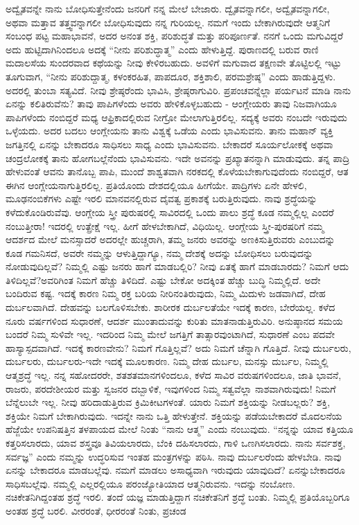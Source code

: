 ಅದ್ವೈತವನ್ನೇ ನಾನು ಬೋಧಿಸುತ್ತೇನೆಂದು ಜನರಿಗೆ ನನ್ನ ಮೇಲೆ ಬೇಜಾರು. ದ್ವೈತವನ್ನಾಗಲೀ, ಅದ್ವೈತವನ್ನಾಗಲೀ, ಅಥವಾ ಮತ್ತಾವ ತತ್ತ್ವವನ್ನಾಗಲೀ ಬೋಧಿಸುವುದು ನನ್ನ ಗುರಿಯಲ್ಲ. ನಮಗೆ ಇಂದು ಬೇಕಾಗಿರುವುದೇ ಆತ್ಮನಿಗೆ ಸಂಬಂಧ ಪಟ್ಟ ಮಹಾಭಾವನೆ, ಅದರ ಅನಂತ ಶಕ್ತಿ, ಪರಿಶುದ್ಧತೆ ಮತ್ತು ಪರಿಪೂರ್ಣತೆ. ನನಗೆ ಒಂದು ಮಗುವಿದ್ದರೆ ಅದು ಹುಟ್ಟಿದಾಗಿನಿಂದಲೂ ಅದಕ್ಕೆ “ನೀನು ಪರಿಶುದ್ಧಾತ್ಮ” ಎಂದು ಹೇಳುತ್ತಿದ್ದೆ. ಪುರಾಣದಲ್ಲಿ ಬರುವ ರಾಣಿ ಮದಾಲಸೆಯ ಸುಂದರವಾದ ಕಥೆಯನ್ನು ನೀವು ಕೇಳಿರಬಹುದು. ಅವಳಿಗೆ ಮಗುವಾದ ತಕ್ಷಣವೇ ತೊಟ್ಟಿಲಲ್ಲಿ ಇಟ್ಟು ತೂಗುವಾಗ, “ನೀನು ಪರಿಶುದ್ದಾತ್ಮ, ಕಳಂಕರಹಿತ, ಪಾಪದೂರ, ಶಕ್ತಿಶಾಲಿ, ಪರಮಶ್ರೇಷ್ಠ” ಎಂದು ಹಾಡುತ್ತಿದ್ದಳು. ಅದರಲ್ಲಿ ತುಂಬಾ ಸತ್ಯವಿದೆ. ನೀವು ಶ್ರೇಷ್ಠರೆಂದು ಭಾವಿಸಿ, ಶ್ರೇಷ್ಠರಾಗುವಿರಿ. ಪ್ರಪಂಚವನ್ನೆಲ್ಲಾ ಪರ್ಯಟನೆ ಮಾಡಿ ನಾನು ಏನನ್ನು ಕಲಿತಿರುವೆನು? ತಾವು ಪಾಪಿಗಳೆಂದು ಅವರು ಹೇಳಿಕೊಳ್ಳಬಹುದು - ಆಂಗ್ಲೇಯರು ತಾವು ನಿಜವಾಗಿಯೂ ಪಾಪಿಗಳೆಂದು ನಂಬಿದ್ದರೆ ಮಧ್ಯ ಆಫ್ರಿಕಾದಲ್ಲಿರುವ ನೀಗ್ರೋ ಮೇಲಾಗುತ್ತಿರಲಿಲ್ಲ. ಸದ್ಯಕ್ಕೆ ಅವರು ನಂಬದೇ ಇರುವುದು ಒಳ್ಳೆಯದು. ಅದರ ಬದಲು ಆಂಗ್ಲೇಯನು ತಾನು ವಿಶ್ವಕ್ಕೆ ಒಡೆಯ ಎಂದು ಭಾವಿಸುವನು. ತಾನು ಮಹಾನ್​ ವ್ಯಕ್ತಿ ಜಗತ್ತಿನಲ್ಲಿ ಏನನ್ನು ಬೇಕಾದರೂ ಸಾಧಿಸಲು ಸಾಧ್ಯ ಎಂದು ಭಾವಿಸುವನು. ಬೇಕಾದರೆ ಸೂರ್ಯಲೋಕಕ್ಕೆ ಅಥವಾ ಚಂದ್ರಲೋಕಕ್ಕೆ ತಾನು ಹೋಗಬಲ್ಲೆನೆಂದು ಭಾವಿಸುವನು. ಇದೇ ಅವನನ್ನು ಪ್ರಖ್ಯಾತನನ್ನಾಗಿ ಮಾಡುವುದು. ತನ್ನ ಪಾದ್ರಿ ಹೇಳುವಂತೆ ಆವನು ತಾನೊಬ್ಬ ಪಾಪಿ, ಮುಂದೆ ಶಾಶ್ವತವಾಗಿ ನರಕದಲ್ಲಿ ಕೊಳೆಯಬೇಕಾಗುವುದೆಂದು ನಂಬಿದ್ದರೆ, ಆತ ಈಗಿನ ಆಂಗ್ಲೇಯ\-ನಾಗುತ್ತಿರಲಿಲ್ಲ. ಪ್ರತಿಯೊಂದು ದೇಶದಲ್ಲಿಯೂ ಹೀಗೆಯೇ. ಪಾದ್ರಿಗಳು ಏನೇ ಹೇಳಲಿ, ಮೂಢನಂಬಿಕೆಗಳು ಎಷ್ಟೇ ಇರಲಿ ಮಾನವನಲ್ಲಿರುವ ದೈವತ್ವ ಪ್ರಕಾಶಕ್ಕೆ ಬರುತ್ತಿರುವುದು. ನಾವು ಶ್ರದ್ಧೆಯನ್ನು ಕಳೆದುಕೊಂಡಿರುವೆವು. ಆಂಗ್ಲೇಯ ಸ್ತ್ರೀ ಪುರುಷರಲ್ಲಿ ಸಾವಿರದಲ್ಲಿ ಒಂದು ಪಾಲು ಶ್ರದ್ಧೆ ಕೂಡ ನಮ್ಮಲ್ಲಿಲ್ಲ ಎಂದರೆ ನಂಬುತ್ತೀರಾ! ಇದರಲ್ಲಿ ಉತ್ಪ್ರೇಕ್ಷೆ ಇಲ್ಲ. ಹೀಗೆ ಹೇಳಬೇಕಾಗಿದೆ, ವಿಧಿಯಿಲ್ಲ. ಆಂಗ್ಲೇಯ ಸ್ತ್ರೀ-ಪುರಷರಿಗೆ ನಮ್ಮ ಆದರ್ಶದ ಮೇಲೆ ಮನಸ್ಸಾದರೆ ಅದರಲ್ಲೇ ಹುಚ್ಚರಾಗಿ, ತಮ್ಮ ಜನರು ಅವರನ್ನು ಅಣಕಿಸುತ್ತಿರುವರು ಎಂಬುದನ್ನು ಕೂಡ ಗಮನಿಸದೆ, ಅವರೇ ನಮ್ಮನ್ನು ಆಳುತ್ತಿದ್ದಾಗ್ಯೂ, ನಮ್ಮ ದೇಶಕ್ಕೆ ಅದನ್ನು ಬೋಧಿಸಲು ಬರುವುದನ್ನು ನೋಡುವುದಿಲ್ಲವೆ? ನಿಮ್ಮಲ್ಲಿ ಎಷ್ಟು ಜನರು ಹಾಗೆ ಮಾಡಬಲ್ಲಿರಿ? ನೀವು ಏತಕ್ಕೆ ಹಾಗೆ ಮಾಡಬಾರದು? ನಿಮಗೆ ಆದು ತಿಳಿದಿಲ್ಲವೆ?\break ಅವರಿಗಿಂತ ನಿಮಗೆ ಹೆಚ್ಚು ತಿಳಿದಿದೆ. ಎಷ್ಟು ಬೇಕೋ ಅದಕ್ಕಿಂತ ಹೆಚ್ಚು ಬುದ್ಧಿ ನಿಮ್ಮಲ್ಲಿದೆ. ಅದೇ ಬಂದಿರುವ ಕಷ್ಟ. ಇದಕ್ಕೆ ಕಾರಣ ನಿಮ್ಮ ರಕ್ತ ಬರಿಯ ನೀರಿನಂತಿರುವುದು, ನಿಮ್ಮ ಮಿದುಳು ಜಡವಾಗಿದೆ, ದೇಹ ದುರ್ಬಲವಾಗಿದೆ. ದೇಹವನ್ನು ಬಲಗೊಳಿಸಬೇಕು. ಶಾರೀರಕ ದುರ್ಬಲತೆಯೇ ಇದಕ್ಕೆ ಕಾರಣ, ಬೇರೆಯಲ್ಲ. ಕಳೆದ ನೂರು ವರ್ಷಗಳಿಂದ ಸುಧಾರಣೆ, ಆದರ್ಶ ಮುಂತಾದುವನ್ನು ಕುರಿತು ಮಾತನಾಡುತ್ತಿರುವಿರಿ. ಅನುಷ್ಠಾನದ ಸಮಯ ಬಂದರೆ ನಿಮ್ಮ ಸುಳಿವೇ ಇಲ್ಲ. ಇದರಿಂದ ನಿಮ್ಮ ಮೇಲೆ ಜಗತ್ತಿಗೆ ತಾತ್ಸಾರವುಂಟಾಗಿದೆ, ಸುಧಾರಣೆ ಎಂಬ ಪದವೇ ಹಾಸ್ಯಾಸ್ಪದವಾಗಿದೆ. ಇದಕ್ಕೆ ಕಾರಣವೇನು? ನಿಮಗೆ ಗೊತ್ತಿಲ್ಲವೆ? ಅದು ನಿಮಗೆ ಚೆನ್ನಾಗಿ ಗೊತ್ತಿದೆ. ನೀವು ದುರ್ಬಲರು, ದುರ್ಬಲರು, ದುರ್ಬಲರು-ಇದೇ ಇದಕ್ಕೆ ಮೂಲಕಾರಣ. ನಿಮ್ಮ ದೇಹ ದುರ್ಬಲ, ಮನಸ್ಸು ದುರ್ಬಲ, ನಿಮ್ಮಲ್ಲಿ ಆತ್ಮಶ್ರದ್ಧೆ ಇಲ್ಲ. ನನ್ನ ಸಹೋದರರೇ, ಶತಶತಮಾನಗಳಿಂದಲೂ, ಕಳೆದ ಸಾವಿರ ವರುಷಗಳಿಂದಲೂ, ಜಾತಿ ಭಾವನೆ, ರಾಜರು, ಪರದೇಶೀಯರ ಮತ್ತು ಸ್ವಜನರ ದಬ್ಬಾಳಿಕೆ, ಇವುಗಳಿಂದ ನಿಮ್ಮ ಸತ್ವವೆಲ್ಲಾ ನಾಶವಾಗಿರುವುದು! ನಿಮಗೆ ಬೆನ್ನೆಲುಬೇ ಇಲ್ಲ. ನೀವು ಹರಿದಾಡುತ್ತಿರುವ ಕ್ರಿಮಿಕೀಟಗಳಂತೆ. ಯಾರು ನಿಮಗೆ ಶಕ್ತಿಯನ್ನು ನೀಡಬಲ್ಲರು? ಶಕ್ತಿ, ಶಕ್ತಿಯೇ ನಿಮಗೆ ಬೇಕಾಗಿರುವುದು. ಇದನ್ನೇ ನಾನು ಒತ್ತಿ ಹೇಳುತ್ತೇನೆ. ಶಕ್ತಿಯನ್ನು ಪಡೆಯಬೇಕಾದರೆ ಮೊದಲನೆಯ ಹೆಜ್ಜೆಯೇ ಉಪನಿಷತ್ತಿನ ತಳಪಾಯದ ಮೇಲೆ ನಿಂತು “ನಾನು ಆತ್ಮ” ಎಂದು ನಂಬುವುದು. “ನನ್ನನ್ನು ಯಾವ ಕತ್ತಿಯೂ ಕತ್ತರಿಸಲಾರದು, ಯಾವ ಶಸ್ತ್ರವೂ ತಿವಿಯಲಾರದು, ಬೆಂಕಿ ದಹಿಸ\-ಲಾರದು, ಗಾಳಿ ಒಣಗಿಸಲಾರದು. ನಾನು ಸರ್ವಶಕ್ತ, ಸರ್ವಜ್ಞ” ಎಂದು ನಮ್ಮನ್ನು ಉದ್ಧರಿಸುವ ಇಂತಹ ಮಂತ್ರಗಳನ್ನು ಪಠಿಸಿ. ನಾವು ದುರ್ಬಲರೆಂದು ಹೇಳಬೇಡಿ. ನಾವು ಏನನ್ನು ಬೇಕಾದರೂ ಮಾಡಬಲ್ಲೆವು. ನಮಗೆ ಮಾಡಲು ಅಸಾಧ್ಯವಾಗಿ ಇರುವುದು ಯಾವುದಿದೆ? ಏನನ್ನುಬೇಕಾದರೂ ಸಾಧಿಸಬಲ್ಲೆವು. ನಮ್ಮಲ್ಲಿ ಎಲ್ಲರಲ್ಲಿಯೂ ಪರಂಜ್ಯೋತಿಯಾದ ಆತ್ಮನಿರುವನು. ಇದನ್ನು ನಂಬೋಣ. ನಚಿಕೇತನಿಗಿದ್ದಂತಹ ಶ್ರದ್ಧೆ ಇರಲಿ. ತಂದೆ ಯಜ್ಞ ಮಾಡುತ್ತಿದ್ದಾಗ ನಚಿಕೇತನಿಗೆ ಶ್ರದ್ಧೆ ಬಂತು. ನಿಮ್ಮಲ್ಲಿ ಪ್ರತಿಯೊಬ್ಬರಿಗೂ ಅಂತಹ ಶ್ರದ್ಧೆ ಬರಲಿ. ವೀರರಂತೆ, ಧೀರರಂತೆ ನಿಂತು, ಪ್ರಚಂಡ\break 